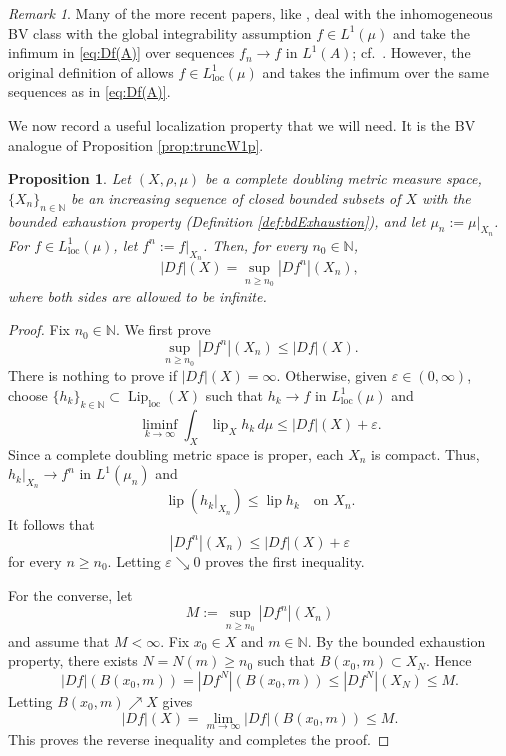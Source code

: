 \documentclass[11pt]{amsart}
\newtheorem{proposition}[theorem]{Proposition}
\theoremstyle{definition}
\theoremstyle{remark}
\newtheorem{remark}[theorem]{Remark}
\numberwithin{equation}{section}
\begin{document}
\begin{remark}
Many of the more recent papers, like \cite[Section 5]{AD:14}, deal with the inhomogeneous BV
class with the global integrability assumption $f\in L^1(\mu)$ and take the infimum in
\eqref{eq:Df(A)} over sequences $f_n\to f$ in $L^1(A)$; cf.\ \cite[(5.1)]{AD:14}. However,
the original definition of \cite[(7)]{M:03} allows $f\in L^1_{\mathrm{loc}}(\mu)$ and takes
the infimum over the same sequences as in \eqref{eq:Df(A)}.
\end{remark}

We now record a useful localization property that we will need. It is the BV analogue of
Proposition \ref{prop:truncW1p}.

\begin{proposition}\label{p-local}
Let $(X,\rho,\mu)$ be a complete doubling metric measure space,
$\{X_n\}_{n\in\mathbb N}$ be an increasing sequence of closed bounded subsets
of $X$ with the bounded exhaustion property (Definition \ref{def:bdExhaustion}),
and let $\mu_n:=\mu|_{X_n}$. For
$f\in L_{\mathrm{loc}}^1(\mu)$, let $f^n:=f|_{X_n}$. Then, for every
$n_0\in\mathbb N$,
\begin{equation}
|Df|(X)=\sup_{n\ge n_0}|Df^n|(X_n),
\end{equation}
where both sides are allowed to be infinite.
\end{proposition}

\begin{proof}
  Fix $n_0\in\mathbb N$.
We first prove
$$
\sup_{n\ge n_0}|Df^n|(X_n)\le |Df|(X).
$$
There is nothing to prove if $|Df|(X)=\infty$. Otherwise, given
$\varepsilon\in(0,\infty)$, choose
$\{h_k\}_{k\in\mathbb N}\subset\operatorname{Lip}_{\mathrm{loc}}(X)$ such that
$h_k\to f$ in $L_{\mathrm{loc}}^1(\mu)$ and
$$
\liminf_{k\to\infty}\int_X\operatorname{lip}_X h_k\,d\mu
\le |Df|(X)+\varepsilon.
$$
Since a complete doubling metric space is proper, each $X_n$ is compact.
Thus, $h_k|_{X_n}\to f^n$ in $L^1(\mu_n)$ and
$$
\operatorname{lip}(h_k|_{X_n})
\le \operatorname{lip} h_k
\quad\text{on }X_n.
$$
It follows that
$$
|Df^n|(X_n)
\le |Df|(X)+\varepsilon
$$
for every $n\ge n_0$. Letting $\varepsilon\searrow 0$ proves the first
inequality.

For the converse, let
$$
M:=\sup_{n\ge n_0}|Df^n|(X_n)
$$
and assume that $M<\infty$. Fix $x_0\in X$ and $m\in\mathbb N$. By the
bounded exhaustion property, there exists $N=N(m)\ge n_0$ such that
$B(x_0,m)\subset X_N$. Hence
$$
|Df|(B(x_0,m))
=
|Df^N|(B(x_0,m))
\le |Df^N|(X_N)
\le M.
$$
Letting $B(x_0,m)\nearrow X$ gives
$$
|Df|(X)=\lim_{m\to\infty}|Df|(B(x_0,m))\le M.
$$
This proves the reverse inequality and completes the proof.
\end{proof}
\end{document}
